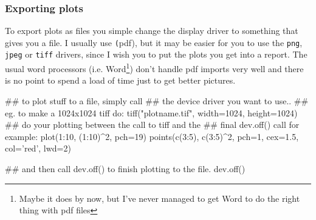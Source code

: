 \documentclass[11pt]{article}
\begin{document}

\subsubsection{Exporting plots}
To export plots as files you simple change the display driver to
something that gives you a file. I usually use \texttt(pdf), but it
may be easier for you to use the \texttt{png}, \texttt{jpeg} or \texttt{tiff}
drivers, since I wish you to put the plots you get into a report.
The usual word processors (i.e. Word\footnote{Maybe it does by now, but I've never
managed to get Word to do the right thing with pdf files}) don't handle pdf imports very
well and there is no point to spend a load of time just to get better pictures.

\begin{rcode}
## to plot stuff to a file, simply call
## the device driver you want to use..
## eg. to make a 1024x1024 tiff do:
tiff("plotname.tif", width=1024, height=1024)
## do your plotting between the call to tiff and the
## final dev.off() call for example:
plot(1:10, (1:10)^2, pch=19)
points(c(3:5), c(3:5)^2, pch=1, cex=1.5, col='red', lwd=2)

## and then call dev.off() to finish plotting to the file.
dev.off()
\end{rcode}
\end{document}

